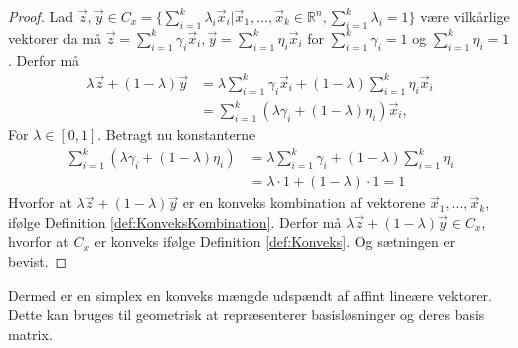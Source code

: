 \begin{proof}
Lad $\vec{z}, \vec{y}\in C_x = \{\sum_{i=1}^k \lambda_i \vec{x}_i| \vec{x}_1, ...,\vec{x}_k \in \mathds{R}^n, \sum_{i=1}^k \lambda_i =1\}$ være vilkårlige vektorer da må $\vec{z}= \sum_{i=1}^k \gamma_i \vec{x}_i, \vec{y}= \sum_{i=1}^k \eta_i \vec{x}_i$ for $\sum_{i=1}^k \gamma_i = 1$ og  $\sum_{i=1}^k \eta_i = 1$. 
Derfor må
\begin{align*}
	\lambda \vec{z} + (1- \lambda) \vec{y} &= \lambda\sum_{i=1}^k \gamma_i \vec{x}_i + (1-\lambda)\sum_{i=1}^k \eta_i \vec{x}_i
	\\ &=\sum_{i=1}^k (\lambda \gamma_i+(1-\lambda)\eta_i )\vec{x}_i,
\end{align*}
For $\lambda \in [0,1]$.
Betragt nu konstanterne 
\begin{align*}
	\sum_{i=1}^k (\lambda \gamma_i+(1-\lambda)\eta_i ) &= \lambda \sum_{i=1}^k \gamma_i + (1 - \lambda) \sum_{i=1}^k \eta_i 
	\\ &= \lambda \cdot 1 + (1 - \lambda) \cdot 1 = 1
\end{align*}
Hvorfor at $\lambda \vec{z} + (1- \lambda) \vec{y} $ er en konveks kombination af vektorene $\vec{x}_1, ...,\vec{x}_k $, ifølge Definition \ref{def:KonveksKombination}. 
Derfor må $ \lambda \vec{z} + (1- \lambda) \vec{y} \in C_x$, hvorfor at $C_x$ er konveks ifølge Definition \ref{def:Konveks}.
Og sætningen er bevist.
\end{proof}
Dermed er en simplex en konveks mængde udspændt af affint lineære vektorer.
Dette kan bruges til geometrisk at repræsenterer basisløsninger og deres basis matrix.
